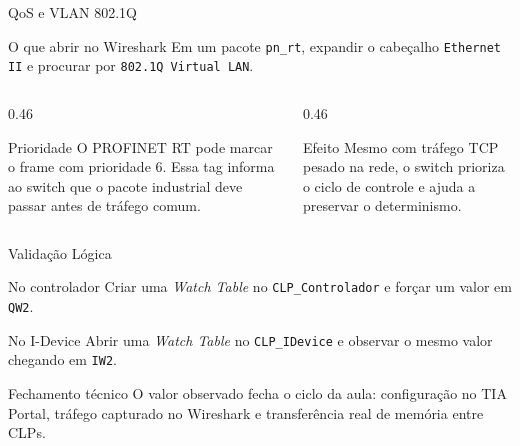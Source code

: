 \documentclass[10pt, aspectratio=169]{beamer}
\begin{document}
\begin{frame}{QoS e VLAN 802.1Q}
    \small
    \begin{block}{O que abrir no Wireshark}
        Em um pacote \texttt{pn\_rt}, expandir o cabe\c{c}alho \texttt{Ethernet II} e procurar por \texttt{802.1Q Virtual LAN}.
    \end{block}

    \begin{columns}[T,totalwidth=\textwidth]
        \begin{column}{0.46\textwidth}
            \begin{block}{Prioridade}
                O PROFINET RT pode marcar o frame com prioridade \alert{6}. Essa tag informa ao switch que o pacote industrial deve passar antes de tr\'afego comum.
            \end{block}
        \end{column}
        \begin{column}{0.46\textwidth}
            \begin{block}{Efeito}
                Mesmo com tr\'afego TCP pesado na rede, o switch prioriza o ciclo de controle e ajuda a preservar o determinismo.
            \end{block}
        \end{column}
    \end{columns}
\end{frame}

\begin{frame}{Valida\c{c}\~ao L\'ogica}
    \small
    \begin{block}{No controlador}
        Criar uma \textit{Watch Table} no \texttt{CLP\_Controlador} e for\c{c}ar um valor em \texttt{QW2}.
    \end{block}

    \begin{block}{No I-Device}
        Abrir uma \textit{Watch Table} no \texttt{CLP\_IDevice} e observar o mesmo valor chegando em \texttt{IW2}.
    \end{block}

    \begin{block}{Fechamento t\'ecnico}
        O valor observado fecha o ciclo da aula: configura\c{c}\~ao no TIA Portal, tr\'afego capturado no Wireshark e transfer\^encia real de mem\'oria entre CLPs.
    \end{block}
\end{frame}
\end{document}
